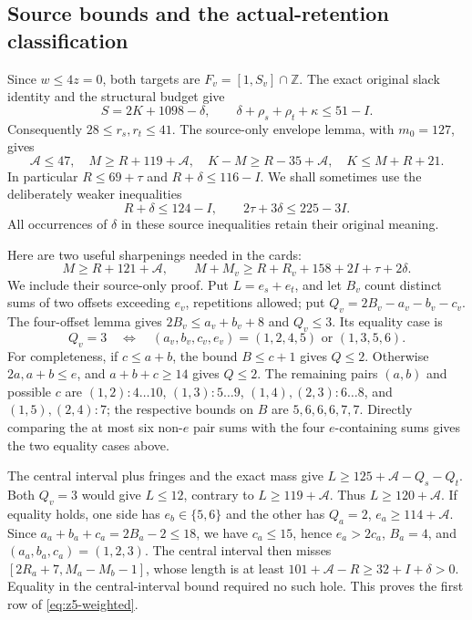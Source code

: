 \documentclass[11pt,letterpaper]{article}
\theoremstyle{definition}\newtheorem{definition}[theorem]{Definition}
\begin{document}
\subsection{Source bounds and the actual-retention classification}
Since $w\le4z=0$, both targets are $F_v=[1,S_v]\cap\mathbb Z$.
The exact original slack identity and the structural budget give
\begin{equation}\label{eq:z5-source}
 S=2K+1098-\delta,\qquad
 \delta+\rho_s+\rho_t+\kappa\le51-I.
\end{equation}
Consequently $28\le r_s,r_t\le41$. The source-only envelope lemma,
with $m_0=127$, gives
\begin{equation}\label{eq:z5-envelope}
 \mathcal A\le47,\quad M\ge R+119+\mathcal A,\quad
 K-M\ge R-35+\mathcal A,\quad K\le M+R+21.
\end{equation}
In particular $R\le69+\tau$ and $R+\delta\le116-I$.
We shall sometimes use the deliberately weaker inequalities
\begin{equation}\label{eq:z5-weak}
 R+\delta\le124-I,\qquad 2\tau+3\delta\le225-3I.
\end{equation}
All occurrences of $\delta$ in these source inequalities retain their
original meaning.

Here are two useful sharpenings needed in the cards:
\begin{equation}\label{eq:z5-weighted}
 M\ge R+121+\mathcal A,\qquad
 M+M_v\ge R+R_v+158+2I+\tau+2\delta.
\end{equation}
We include their source-only proof. Put $L=e_s+e_t$, and let $B_v$
count distinct sums of two offsets exceeding $e_v$, repetitions allowed;
put $Q_v=2B_v-a_v-b_v-c_v$. The four-offset lemma gives
$2B_v\le a_v+b_v+8$ and $Q_v\le3$. Its equality case is
\[
 Q_v=3\quad\Longleftrightarrow\quad
 (a_v,b_v,c_v,e_v)=(1,2,4,5)\text{ or }(1,3,5,6).
\]
For completeness, if $c\le a+b$, the bound $B\le c+1$ gives $Q\le2$.
Otherwise $2a,a+b\le e$, and $a+b+c\ge14$ gives $Q\le2$.
The remaining pairs $(a,b)$ and possible $c$ are
$(1,2):4\ldots10$, $(1,3):5\ldots9$, $(1,4),(2,3):6\ldots8$,
and $(1,5),(2,4):7$; the respective bounds on $B$ are $5,6,6,6,7,7$.
Directly comparing the at most six non-$e$ pair sums with the four
$e$-containing sums gives the two equality cases above.

The central interval plus fringes and the exact mass give
$L\ge125+\mathcal A-Q_s-Q_t$. Both $Q_v=3$ would give $L\le12$,
contrary to $L\ge119+\mathcal A$. Thus $L\ge120+\mathcal A$.
If equality holds, one side has $e_b\in\{5,6\}$ and the other has
$Q_a=2$, $e_a\ge114+\mathcal A$. Since
$a_a+b_a+c_a=2B_a-2\le18$, we have $c_a\le15$, hence
$e_a>2c_a$, $B_a=4$, and $(a_a,b_a,c_a)=(1,2,3)$.
The central interval then misses
$[2R_a+7,M_a-M_b-1]$, whose length is at least
$101+\mathcal A-R\ge32+I+\delta>0$. Equality in the
central-interval bound required no such hole. This proves the first row
of \eqref{eq:z5-weighted}.
\end{document}
